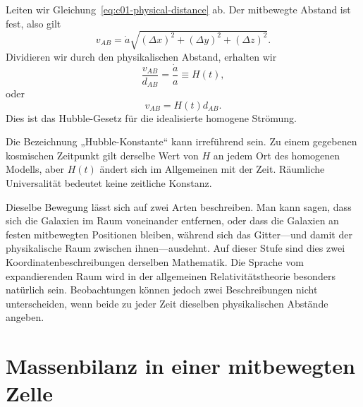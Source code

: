 Leiten wir Gleichung~\eqref{eq:c01-physical-distance} ab. Der mitbewegte Abstand ist fest, also gilt
\begin{equation}
v_{AB}=\dot a\sqrt{(\Delta x)^2+(\Delta y)^2+(\Delta z)^2}.
\end{equation}
Dividieren wir durch den physikalischen Abstand, erhalten wir
\begin{equation}
\frac{v_{AB}}{d_{AB}}=\frac{\dot a}{a}\equiv H(t),
\label{eq:c01-hubble-parameter}
\end{equation}
oder
\begin{equation}
\boxed{v_{AB}=H(t)d_{AB}.}
\label{eq:c01-hubble-law}
\end{equation}
Dies ist das Hubble-Gesetz für die idealisierte homogene Strömung.

Die Bezeichnung „Hubble-Konstante“ kann irreführend sein. Zu einem gegebenen kosmischen Zeitpunkt gilt derselbe Wert von \(H\) an jedem Ort des homogenen Modells, aber \(H(t)\) ändert sich im Allgemeinen mit der Zeit. Räumliche Universalität bedeutet keine zeitliche Konstanz.

\begin{classroomqa}
\end{classroomqa}

Dieselbe Bewegung lässt sich auf zwei Arten beschreiben. Man kann sagen, dass sich die Galaxien im Raum voneinander entfernen, oder dass die Galaxien an festen mitbewegten Positionen bleiben, während sich das Gitter---und damit der physikalische Raum zwischen ihnen---ausdehnt. Auf dieser Stufe sind dies zwei Koordinatenbeschreibungen derselben Mathematik. Die Sprache vom expandierenden Raum wird in der allgemeinen Relativitätstheorie besonders natürlich sein. Beobachtungen können jedoch zwei Beschreibungen nicht unterscheiden, wenn beide zu jeder Zeit dieselben physikalischen Abstände angeben.

\section{Massenbilanz in einer mitbewegten Zelle}

